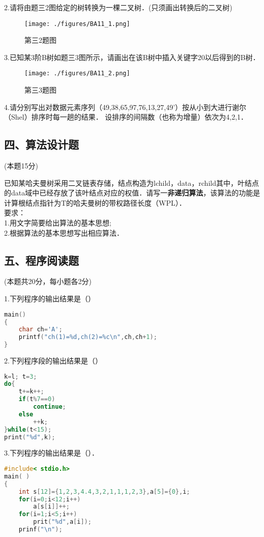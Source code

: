 2.请将由题三2图给定的树转换为一棵二叉树．(只须画出转换后的二叉树)
\begin{figure}[ht]
\centering
\texttt{[image: ./figures/BA11\_1.png]}
\caption{第三2题图} \label{BA11_fig1}
\end{figure}

3.已知某3阶B树如题三3图所示，请画出在该B树中插入关键字20以后得到的B树．
\begin{figure}[ht]
\centering
\texttt{[image: ./figures/BA11\_2.png]}
\caption{第三3题图} \label{BA11_fig2}
\end{figure}

4.请分别写出对数据元素序列（49,38,65,97,76,13,27,49'）按从小到大进行谢尔（Shel）排序时每一趟的结果． 设排序的间隔数（也称为增量）依次为4,2,1．

\subsection{四、算法设计题}
(本题15分)

已知某哈夫曼树采用二叉链表存储，结点构造为lchild，data，rchild其中，叶结点的data域中已经存放了该叶结点对应的权值．请写一\textbf{非递归算法}，该算法的功能是计算根结点指针为T的哈夫曼树的带权路径长度（WPL）． \\
要求： \\
1.用文字简要给出算法的基本思想; \\
2.根据算法的基本思想写出相应算法．

\subsection{五、程序阅读题}

(本题共20分，每小题各2分)

1.下列程序的输出结果是（） \\
\begin{lstlisting}[language=cpp]
main()
{
    char ch='A';
    printf("ch(1)=%d,ch(2)=%c\n",ch,ch+1);
}
\end{lstlisting}

2.下列程序段的输出结果是（）
\begin{lstlisting}[language=cpp]
k=l; t=3;
do{
    t+=k++;
    if(t%7==0)
        continue;
    else
        ++k;
}while(t<15);
print("%d",k);
\end{lstlisting}

3.下列程序的输出结果是（）．
\begin{lstlisting}[language=cpp]
#include< stdio.h>
main( )
{
    int s[12]={1,2,3,4.4,3,2,1,1,1,2,3},a[5]={0},i;
    for(i=0;i<12;i++)
        a[s[i]]++;
    for(i=1;i<5;i++)
        prit("%d",a[i]);
    prinf("\n");
\end{lstlisting}

